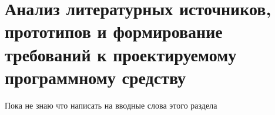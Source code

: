 \section{Анализ литературных источников, прототипов и формирование требований к проектируемому программному средству}
\label{sec:analysis}

Пока не знаю что написать на вводные слова этого раздела






